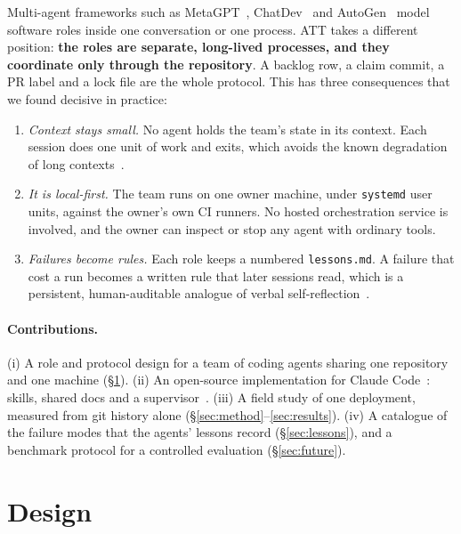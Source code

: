 \documentclass[11pt]{article}
\begin{document}
Multi-agent frameworks such as MetaGPT~\citep{hong2023metagpt},
ChatDev~\citep{qian2023chatdev} and AutoGen~\citep{wu2023autogen} model
software roles inside one conversation or one process. ATT takes a different
position: \textbf{the roles are separate, long-lived processes, and they
coordinate only through the repository}. A backlog row, a claim commit, a PR
label and a lock file are the whole protocol. This has three consequences that
we found decisive in practice:
\begin{enumerate}[leftmargin=*,itemsep=2pt]
  \item \emph{Context stays small.} No agent holds the team's state in its
        context. Each session does one unit of work and exits, which avoids the
        known degradation of long contexts~\citep{liu2023lost}.
  \item \emph{It is local-first.} The team runs on one owner machine, under
        \texttt{systemd} user units, against the owner's own CI runners. No
        hosted orchestration service is involved, and the owner can inspect or
        stop any agent with ordinary tools.
  \item \emph{Failures become rules.} Each role keeps a numbered
        \texttt{lessons.md}. A failure that cost a run becomes a written rule
        that later sessions read, which is a persistent, human-auditable
        analogue of verbal self-reflection~\citep{shinn2023reflexion}.
\end{enumerate}

\paragraph{Contributions.}
(i) A role and protocol design for a team of coding agents sharing one
repository and one machine (\S\ref{sec:design}). (ii) An open-source
implementation for Claude Code~\citep{claudecode}: skills, shared docs and a
supervisor~\citep{att}. (iii) A field study of one deployment, measured from
git history alone (\S\ref{sec:method}--\ref{sec:results}). (iv) A catalogue of
the failure modes that the agents' lessons record (\S\ref{sec:lessons}), and a
benchmark protocol for a controlled evaluation (\S\ref{sec:future}).

\section{Design}\label{sec:design}
\end{document}
